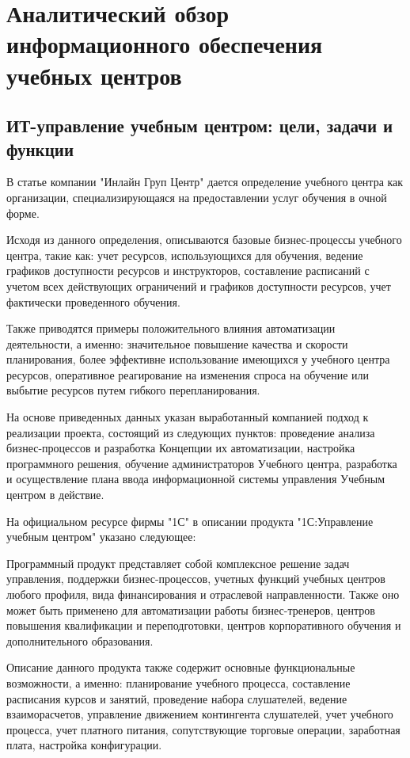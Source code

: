 \section{Аналитический обзор информационного обеспечения учебных центров}
\subsection{ИТ-управление учебным центром: цели, задачи и функции}

В статье компании "Инлайн Груп Центр" \cite{inlinegroup-c} дается определение учебного центра как организации, специализирующаяся на предоставлении услуг обучения в очной форме.

Исходя из данного определения, описываются базовые бизнес-процессы учебного центра, такие как: учет ресурсов, использующихся для обучения, ведение графиков доступности ресурсов и инструкторов, составление расписаний с учетом всех действующих ограничений и графиков доступности ресурсов, учет фактически проведенного обучения.

Также приводятся примеры положительного влияния автоматизации деятельности, а именно: значительное повышение качества и скорости планирования, более эффективне использование имеющихся у учебного центра ресурсов, оперативное реагирование на изменения спроса на обучение или выбытие ресурсов путем гибкого перепланирования.

На основе приведенных данных указан выработанный компанией подход к реализации проекта, состоящий из следующих пунктов: проведение анализа бизнес-процессов и разработка Концепции их автоматизации, настройка программного решения, обучение администраторов Учебного центра, разработка и осуществление плана ввода информационной системы управления Учебным центром в действие.

На официальном ресурсе \cite{1c-training-center} фирмы "1С" в описании продукта "1С:Управление учебным центром" указано следующее:

Программный продукт представляет собой комплексное решение задач управления, поддержки бизнес-процессов, учетных функций учебных центров любого профиля, вида финансирования и отраслевой направленности.
Также оно может быть применено для автоматизации работы бизнес-тренеров, центров повышения квалификации и переподготовки, центров корпоративного обучения и дополнительного образования.

Описание данного продукта также содержит основные функциональные возможности, а именно: планирование учебного процесса, составление расписания курсов и занятий, проведение набора слушателей, ведение взаиморасчетов, управление движением контингента слушателей, учет учебного процесса, учет платного питания, сопутствующие торговые операции, заработная плата, настройка конфигурации.

